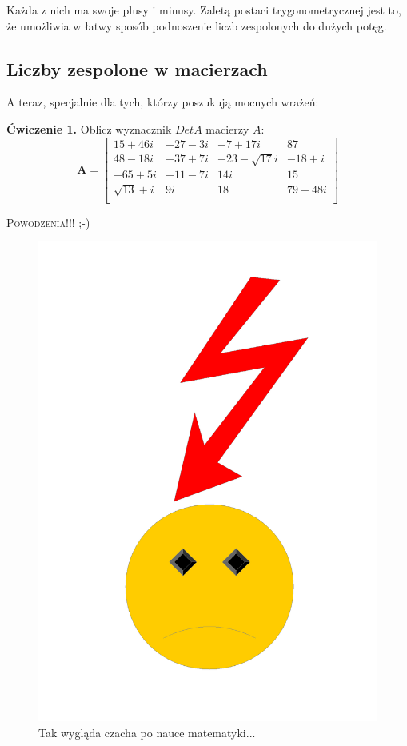 \documentclass[a4paper,12pt]{article}
\begin{document}
Każda z nich ma swoje plusy i minusy. Zaletą postaci trygonometrycznej jest to, że umożliwia w łatwy sposób podnoszenie liczb zespolonych do dużych potęg.
\cite{matemaks4}

\subsection{Liczby zespolone w macierzach}
\label{subsec:LiczbyZespoloneWMacierzach}
A teraz, specjalnie dla tych, którzy poszukują mocnych wrażeń:

\textbf{Ćwiczenie 1.} Oblicz wyznacznik $Det A$ macierzy $A$:
\begin{displaymath}
\mathbf{A} =
\left[ \begin{array}{cccc}
15+46i & -27-3i & -7+17i & 87 \\
48-18i & -37+7i & -23-\sqrt{17}i & -18+i \\
-65+5i & -11-7i & 14i & 15 \\
\sqrt{13}+i & 9i & 18 & 79-48i \\
\end{array} \right]
\end{displaymath}
\begin{center}
\textsc{{\huge Powodzenia!!! ;-)}}
\end{center}
\begin{figure}[h]
\centering
\includegraphics[scale=0.25]{buzka.pdf}
\caption{Tak wygląda czacha po nauce matematyki...}
\label{fig:buzka}
\end{figure}
\newpage
\end{document}
